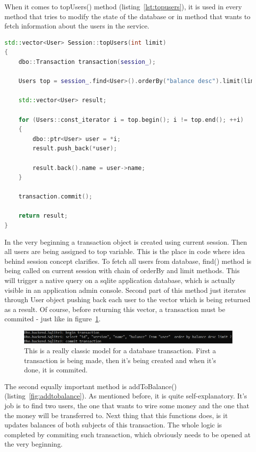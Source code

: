 \documentclass[a4paper,12pt]{book}
\begin{document}
{\bigskip
When it comes to topUsers() method (listing~\ref{lst:topusers}), it is used in every method that tries to modify the state of the database or in method that wants to fetch information about the users in the service.

\bigskip
\begin{lstlisting}[frame=single, label={lst:topusers}, basicstyle=\small, language=C++, caption={Session::topUsers() method.}, captionpos=b]
std::vector<User> Session::topUsers(int limit)
{
	dbo::Transaction transaction(session_);

	Users top = session_.find<User>().orderBy("balance desc").limit(limit);

	std::vector<User> result;
	
	for (Users::const_iterator i = top.begin(); i != top.end(); ++i) 
	{
		dbo::ptr<User> user = *i;
		result.push_back(*user);

		result.back().name = user->name;
	}

	transaction.commit();

	return result;
}
\end{lstlisting}

\bigskip
In the very beginning a transaction object is created using current session. Then all users are being assigned to top variable. This is the place in code where idea behind session concept clarifies. To fetch all users from database, find() method is being called on current session with chain of orderBy and limit methods. This will trigger a native query on a sqlite application database, which is actually visible in an application admin console. Second part of this method just iterates through User object pushing back each user to the vector which is being returned as a result. Of course, before returning this vector, a transaction must be commited - just like in figure~\ref{fig:committransaction}.

\begin{figure}[H]
\centering
\includegraphics[width=1.0\textwidth]{transaction}
\caption{This is a really classic model for a database transaction. First a transaction is being made, then it's being created and when it's done, it is commited.}
\label{fig:committransaction}
\end{figure}

\bigskip
The second equally important method is addToBalance()(listing~\ref{fig:addtobalance}). As mentioned before, it is quite self-explanatory. It's job is to find two users, the one that wants to wire some money and the one that the money will be transferred to. Next thing that this functions does, is it updates balances of both subjects of this transaction. The whole logic is completed by commiting such transaction, which obviously needs to be opened at the very beginning.

}
\end{document}
